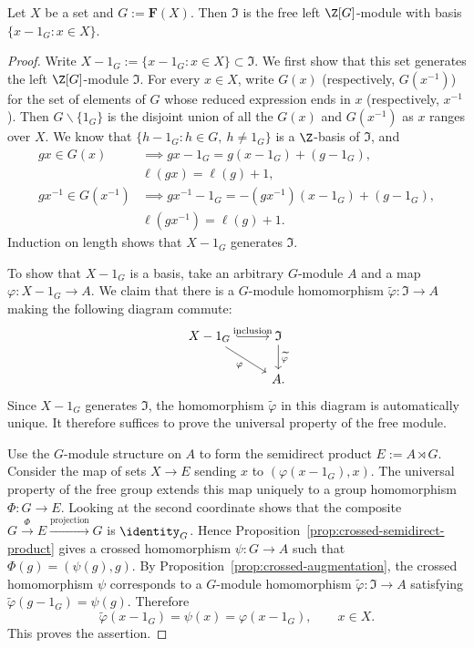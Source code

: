 \begin{lemma}\label{prop:free-group-augmentation}
	Let $X$ be a set and $G:=\mathbf{F}(X)$. Then $\mathfrak{I}$ is the free
	left $\Z[G]$-module with basis
	$\{x-1_G:x\in X\}$.
\end{lemma}
\begin{proof}
	Write $X-1_G:=\{x-1_G:x\in X\}\subset\mathfrak{I}$. We first show that
	this set generates the left $\Z[G]$-module $\mathfrak{I}$. For every
	$x\in X$, write $G(x)$ (respectively, $G(x^{-1})$) for the set of
	elements of $G$ whose reduced expression ends in $x$ (respectively,
	$x^{-1}$). Then $G\smallsetminus\{1_G\}$ is the disjoint union of all
	the $G(x)$ and $G(x^{-1})$ as $x$ ranges over $X$. We know that
	$\{h-1_G:h\in G,\ h\neq1_G\}$ is a $\Z$-basis of $\mathfrak{I}$, and
	\begin{align*}
		gx\in G(x)&\implies gx-1_G=g(x-1_G)+(g-1_G),\\
		&\ell(gx)=\ell(g)+1,\\
		gx^{-1}\in G(x^{-1})&\implies
		gx^{-1}-1_G=-(gx^{-1})(x-1_G)+(g-1_G),\\
		&\ell(gx^{-1})=\ell(g)+1.
	\end{align*}
	Induction on length shows that $X-1_G$ generates $\mathfrak{I}$.

	To show that $X-1_G$ is a basis, take an arbitrary $G$-module $A$ and a
	map $\varphi:X-1_G\to A$. We claim that there is a $G$-module
	homomorphism $\widetilde{\varphi}:\mathfrak{I}\to A$ making the following
	diagram commute:
	\[\begin{tikzcd}
		X-1_G \arrow[hookrightarrow,r,"\text{inclusion}"]
		\arrow[rd,"\varphi"'] & \mathfrak{I} \arrow[d,"{\widetilde{\varphi}}"]\\
		& A.
	\end{tikzcd}\]
	Since $X-1_G$ generates $\mathfrak{I}$, the homomorphism
	$\widetilde{\varphi}$ in this diagram is automatically unique. It therefore
	suffices to prove the universal property of the free module.

	Use the $G$-module structure on $A$ to form the semidirect product
	$E:=A\rtimes G$. Consider the map of sets $X\to E$ sending $x$ to
	$(\varphi(x-1_G),x)$. The universal property of the free group extends
	this map uniquely to a group homomorphism $\Phi:G\to E$. Looking at the
	second coordinate shows that the composite
	$G\xrightarrow{\Phi}E\xrightarrow{\text{projection}}G$ is
	$\identity_G$. Hence Proposition~\ref{prop:crossed-semidirect-product}
	gives a crossed homomorphism $\psi:G\to A$ such that
	$\Phi(g)=(\psi(g),g)$. By
	Proposition~\ref{prop:crossed-augmentation}, the crossed homomorphism
	$\psi$ corresponds to a $G$-module homomorphism
	$\widetilde{\varphi}:\mathfrak{I}\to A$ satisfying
	$\widetilde{\varphi}(g-1_G)=\psi(g)$. Therefore
	\[ \widetilde{\varphi}(x-1_G)=\psi(x)=\varphi(x-1_G),
	\qquad x\in X. \]
	This proves the assertion.
\end{proof}

